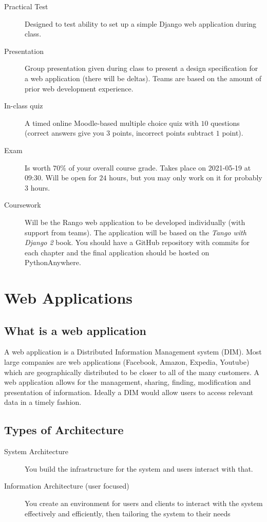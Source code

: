 \begin{description}
	\item[Practical Test] Designed to test ability to set up a simple Django web application during class.
	\item[Presentation] Group presentation given during class to present a design specification for a web application (there will be deltas). Teams are based on the amount of prior web development experience.
	\item[In-class quiz] A timed online Moodle-based multiple choice quiz with \(10\) questions (correct answers give you \(3\) points, incorrect points subtract \(1\) point).
	\item[Exam] Is worth \(70\%\) of your overall course grade. Takes place on 2021-05-19 at 09:30. Will be open for \(24\) hours, but you may only work on it for probably \(3\) hours.
	\item[Coursework] Will be the Rango web application to be developed individually (with support from teams).
		The application will be based on the \emph{Tango with Django 2} book.
		You should have a GitHub repository with commits for each chapter and the final application should be hosted on PythonAnywhere.
\end{description}

\section{Web Applications}\label{sec:web_applications}

\subsection{What is a web application}\label{sub:what_is_a_web_app}

A web application is a Distributed Information Management system (DIM).
Most large companies are web applications (Facebook, Amazon, Expedia, Youtube) which are geographically distributed to be closer to all of the many customers.
A web application allows for the management, sharing, finding, modification and presentation of information.
Ideally a DIM would allow users to access relevant data in a timely fashion.

\subsection{Types of Architecture}\label{sub:types_of_architecture}

\begin{description}
	\item[System Architecture] You build the infrastructure for the system and users interact with that.
	\item[Information Architecture (user focused)] You create an environment for users and clients to interact with the system effectively and efficiently, then tailoring the system to their needs
\end{description}

